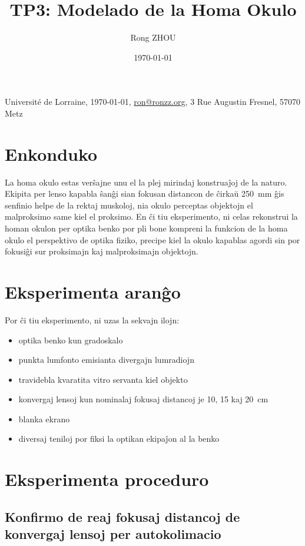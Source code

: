 \documentclass[a4paper,11pt]{article}
\title{TP3: Modelado de la Homa Okulo}
\author{Rong ZHOU}
\date{\today}
\newcommand{\univaddress}{3 Rue Augustin Fresnel, 57070 Metz}
\begin{document}
\maketitle
\begin{center}
  \small Universit\'e de Lorraine, \today, \href{mailto:ron@ronzz.org}{ron@ronzz.org}, \univaddress
\end{center}

\section{Enkonduko}

La homa okulo estas verŝajne unu el la plej mirindaj konstruaĵoj de la naturo. Ekipita per lenso kapabla ŝanĝi sian fokusan distancon de ĉirkaŭ 250~mm ĝis senfinio helpe de la rektaj muskoloj, nia okulo perceptas objektojn el malproksimo same kiel el proksimo. En ĉi tiu eksperimento, ni celas rekonstrui la homan okulon per optika benko por pli bone kompreni la funkcion de la homa okulo el perspektivo de optika fiziko, precipe kiel la okulo kapablas agordi sin por fokusiĝi sur proksimajn kaj malproksimajn objektojn.

\section{Eksperimenta aranĝo}

Por ĉi tiu eksperimento, ni uzas la sekvajn ilojn:

\begin{itemize}
    \item optika benko kun gradoskalo
    \item punkta lumfonto emisianta divergajn lumradiojn
    \item travidebla kvaratita vitro servanta kiel objekto
    \item konvergaj lensoj kun nominalaj fokusaj distancoj je 10, 15 kaj 20~cm
    \item blanka ekrano
    \item diversaj teniloj por fiksi la optikan ekipaĵon al la benko
\end{itemize}

\section{Eksperimenta proceduro}

\subsection{Konfirmo de reaj fokusaj distancoj de konvergaj lensoj per autokolimacio}
\end{document}
